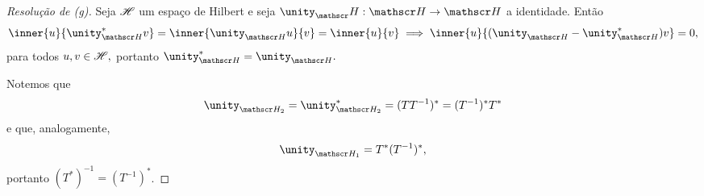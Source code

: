 \begin{proof}[Resolução de (g)]
  Seja \(\mathscr{H}\) um espaço de Hilbert e seja \(\unity_\hilbert : \hilbert\to \hilbert\) a identidade. Então
  \begin{equation*}
    \inner{u}{\unity_{\hilbert}^* v} = \inner{\unity_{\hilbert}u}{v} = \inner{u}{v}  \implies \inner{u}{(\unity_{\hilbert} - \unity_{\hilbert}^*)v} = 0,
  \end{equation*}
  para todos \(u, v \in \mathscr{H},\) portanto \(\unity_{\hilbert}^* = \unity_{\hilbert}.\)

  Notemos que
  \begin{equation*}
    \unity_{\hilbert_2} = \unity_{\hilbert_2}^* = (T T^{-1})^* = (T^{-1})^* T^*
  \end{equation*}
  e que, analogamente,
  \begin{equation*}
    \unity_{\hilbert_1} = T^* (T^{-1})^*,
  \end{equation*}
  portanto \((T^*)^{-1} = (T^{-1})^*\).
\end{proof}

